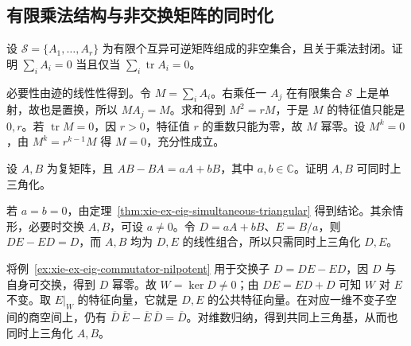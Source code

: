 \subsection{有限乘法结构与非交换矩阵的同时化}

\begin{example}
设 $\mathcal S=\{A_1,\ldots,A_r\}$ 为有限个互异可逆矩阵组成的非空集合，且关于乘法封闭。证明 $\sum_iA_i=0$ 当且仅当 $\sum_i\operatorname{tr}A_i=0$。
\end{example}
\begin{solve}
必要性由迹的线性性得到。令 $M=\sum_iA_i$。右乘任一 $A_j$ 在有限集合 $\mathcal S$ 上是单射，故也是置换，所以 $MA_j=M$。求和得到 $M^2=rM$，于是 $M$ 的特征值只能是 $0,r$。若 $\operatorname{tr}M=0$，因 $r>0$，特征值 $r$ 的重数只能为零，故 $M$ 幂零。设 $M^k=0$，由 $M^k=r^{k-1}M$ 得 $M=0$，充分性成立。
\end{solve}

\begin{example}
设 $A,B$ 为复矩阵，且 $AB-BA=aA+bB$，其中 $a,b\in\mathbb C$。证明 $A,B$ 可同时上三角化。
\end{example}
\begin{solve}
若 $a=b=0$，由定理~\ref{thm:xie-ex-eig-simultaneous-triangular} 得到结论。其余情形，必要时交换 $A,B$，可设 $a\ne0$。令 $D=aA+bB$、$E=B/a$，则 $DE-ED=D$，而 $A,B$ 均为 $D,E$ 的线性组合，所以只需同时上三角化 $D,E$。

将例~\ref{ex:xie-ex-eig-commutator-nilpotent} 用于交换子 $D=DE-ED$，因 $D$ 与自身可交换，得到 $D$ 幂零。故 $W=\ker D\ne0$；由 $DE=ED+D$ 可知 $W$ 对 $E$ 不变。取 $E|_W$ 的特征向量，它就是 $D,E$ 的公共特征向量。在对应一维不变子空间的商空间上，仍有 $\overline D\,\overline E-\overline E\,\overline D=\overline D$。对维数归纳，得到共同上三角基，从而也同时上三角化 $A,B$。
\end{solve}





